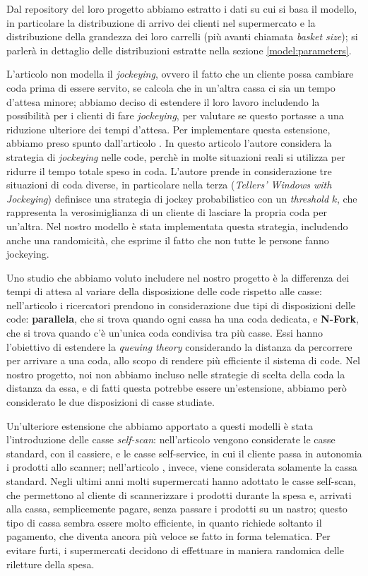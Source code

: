Dal repository del loro progetto abbiamo estratto i dati su cui si basa il modello, in particolare la distribuzione di arrivo dei clienti nel supermercato e la distribuzione della grandezza dei loro carrelli (più avanti chiamata \textit{basket size}); si parlerà in dettaglio delle distribuzioni estratte nella sezione \ref{model:parameters}.

L'articolo \cite{article1} non modella il \textit{jockeying}, ovvero il fatto che un cliente possa cambiare coda prima di essere servito, se calcola che in un'altra cassa ci sia un tempo d'attesa minore; abbiamo deciso di estendere il loro lavoro includendo la possibilità per i clienti di fare \textit{jockeying}, per valutare se questo portasse a una riduzione ulteriore dei tempi d'attesa. Per implementare questa estensione, abbiamo preso spunto dall'articolo \cite{koenigsberg1966jockeying}.
In questo articolo l'autore considera la strategia di \textit{jockeying} nelle code, perchè in molte situazioni reali si utilizza per ridurre il tempo totale speso in coda. L'autore prende in considerazione tre situazioni di coda diverse, in particolare nella terza (\textit{Tellers' Windows with Jockeying}) definisce una strategia di jockey probabilistico con un \textit{threshold} $k$, che rappresenta la verosimiglianza di un cliente di lasciare la propria coda per un'altra. Nel nostro modello è stata implementata questa strategia, includendo anche una randomicità, che esprime il fatto che non tutte le persone fanno jockeying.

Uno studio che abbiamo voluto includere nel nostro progetto è la differenza dei tempi di attesa al variare della disposizione delle code rispetto alle casse: nell'articolo \cite{yanagisawa2011methods} i ricercatori prendono in considerazione due tipi di disposizioni delle code: \textbf{parallela}, che si trova quando ogni cassa ha una coda dedicata, e \textbf{N-Fork}, che si trova quando c'è un'unica coda condivisa tra più casse. Essi hanno l'obiettivo di estendere la \textit{queuing theory} considerando la distanza da percorrere per arrivare a una coda, allo scopo di rendere più efficiente il sistema di code. Nel nostro progetto, noi non abbiamo incluso nelle strategie di scelta della coda la distanza da essa, e di fatti questa potrebbe essere un'estensione, abbiamo però considerato le due disposizioni di casse studiate. 

Un'ulteriore estensione che abbiamo apportato a questi modelli è stata
l'introduzione delle casse \textit{self-scan}: nell'articolo
\cite{article1} vengono considerate le casse standard, con il
cassiere, e le casse self-service, in cui il cliente passa in
autonomia i prodotti allo scanner; nell'articolo
\cite{yanagisawa2011methods}, invece, viene considerata solamente la
cassa standard. Negli ultimi anni molti supermercati hanno adottato le
casse self-scan, che permettono al cliente di scannerizzare i prodotti
durante la spesa e, arrivati alla cassa, semplicemente pagare, senza
passare i prodotti su un nastro; questo tipo di cassa sembra essere
molto efficiente, in quanto richiede soltanto il pagamento, che
diventa ancora più veloce se fatto in forma telematica. Per evitare
furti, i supermercati decidono di effettuare in maniera randomica
delle riletture della spesa.

